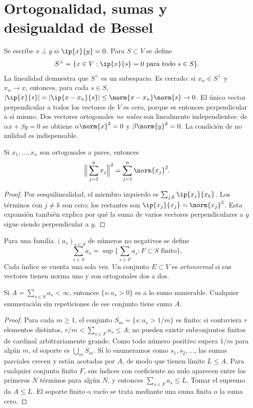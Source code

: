 \section{Ortogonalidad, sumas y desigualdad de Bessel}
Se escribe $x\perp y$ si $\ip{x}{y}=0$. Para $S\subset V$ se define
\[
 S^{\perp}=\{x\in V:\ip{x}{s}=0\text{ para todo }s\in S\}.
\]
La linealidad demuestra que $S^{\perp}$ es un subespacio. Es cerrado: si $x_n\in S^{\perp}$ y $x_n\to x$, entonces, para cada $s\in S$,
$|\ip{x}{s}|=|\ip{x-x_n}{s}|\leq\norm{x-x_n}\norm{s}\to0$.
El único vector perpendicular a todos los vectores de $V$ es cero, porque es entonces perpendicular a sí mismo. Dos vectores ortogonales \emph{no nulos} son linealmente independientes: de $\alpha x+\beta y=0$ se obtiene $\alpha\norm{x}^{2}=0$ y $\beta\norm{y}^{2}=0$. La condición de no nulidad es indispensable.

\begin{teorema}[Pitágoras]\label{ch29:pitagoras}
Si $x_1,\dots,x_n$ son ortogonales a pares, entonces
\[
 \Big\|\sum_{j=1}^{n}x_j\Big\|^{2}=\sum_{j=1}^{n}\norm{x_j}^{2}.
\]
\end{teorema}
\begin{proof}
Por sesquilinealidad, el miembro izquierdo es $\sum_{j,k}\ip{x_j}{x_k}$. Los términos con $j\ne k$ son cero; los restantes son $\ip{x_j}{x_j}=\norm{x_j}^{2}$. Esta expansión también explica por qué la suma de varios vectores perpendiculares a $y$ sigue siendo perpendicular a $y$.
\end{proof}

\begin{definicion}\label{ch29:suma}
Para una familia $(a_s)_{s\in S}$ de números no negativos se define
\[
 \sum_{s\in S}a_s=\sup\Big\{\sum_{s\in F}a_s:F\subset S\text{ finito}\Big\}.
\]
Cada índice se cuenta una sola vez. Un conjunto $E\subset V$ es \emph{ortonormal} si sus vectores tienen norma uno y son ortogonales dos a dos.
\end{definicion}

\begin{lema}\label{ch29:soporte}
Si $A=\sum_{s\in S}a_s<\infty$, entonces $\{s:a_s>0\}$ es a lo sumo numerable. Cualquier enumeración sin repeticiones de ese conjunto tiene suma $A$.
\end{lema}
\begin{proof}
Para cada $m\geq1$, el conjunto $S_m=\{s:a_s>1/m\}$ es finito: si contuviera $r$ elementos distintos, $r/m<\sum_{s\in F}a_s\leq A$; no pueden existir subconjuntos finitos de cardinal arbitrariamente grande. Como todo número positivo supera $1/m$ para algún $m$, el soporte es $\bigcup_m S_m$. Si lo enumeramos como $s_1,s_2,\dots$, las sumas parciales crecen y están acotadas por $A$, de modo que tienen límite $L\leq A$. Para cualquier conjunto finito $F$, sus índices con coeficiente no nulo aparecen entre los primeros $N$ términos para algún $N$, y entonces $\sum_{s\in F}a_s\leq L$. Tomar el supremo da $A\leq L$. El soporte finito o vacío se trata mediante una suma finita o la suma cero.
\end{proof}

